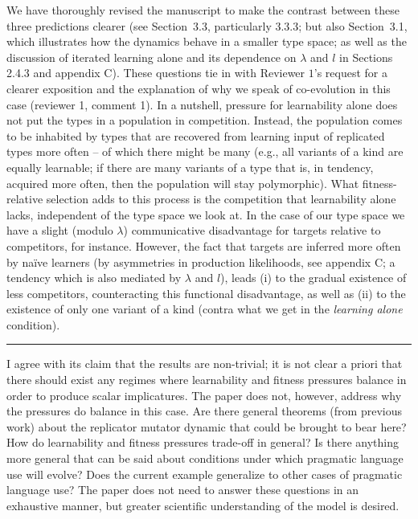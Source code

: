 \documentclass[12pt,a4paper]{article}
\begin{document}
We have thoroughly revised the manuscript to make the contrast between these three predictions clearer (see Section~3.3, particularly 3.3.3; but also Section~3.1, which illustrates how the dynamics behave in a smaller type space; as well as the discussion of iterated learning alone and its dependence on $\lambda$ and $l$ in Sections 2.4.3 and appendix C). These questions tie in with Reviewer $1$'s request for a clearer exposition and the explanation of why we speak of co-evolution in this case (reviewer 1, comment 1). In a nutshell, pressure for learnability alone does not put the types in a population in competition. Instead, the population comes to be inhabited by types that are recovered from learning input of replicated types more often -- of which there might be many (e.g., all variants of a kind are equally learnable; if there are many variants of a type that is, in tendency, acquired more often, then the population will stay polymorphic). What fitness-relative selection adds to this process is the competition that learnability alone lacks, independent of the type space we look at. In the case of our type space we have a slight (modulo $\lambda$) communicative disadvantage for targets relative to competitors, for instance. However, the fact that targets are inferred more often by na\"ive learners (by asymmetries in production likelihoods, see appendix C; a tendency which is also mediated by $\lambda$ and $l$), leads (i) to the gradual existence of less competitors, counteracting this functional disadvantage, as well as (ii) to the existence of only one variant of a kind (contra what we get in the {\em learning alone} condition).
%

\vspace{0.5cm}

\noindent\rule{\textwidth}{1pt}

\begin{mdframed}[backgroundcolor=gray!25,linecolor=gray!25,frametitle= Reviewer \thereviewerCounter~comment \thereviewerCommentCounter \hfill ~~({\it Model predictions})]
%
I agree with its claim that the results are non-trivial; it is not clear a priori that there should exist any regimes where learnability and fitness pressures balance in order to produce scalar implicatures. The paper does not, however, address why the pressures do balance in this case. Are there general theorems (from previous work) about the replicator mutator dynamic that could be brought to bear here? How do learnability and fitness pressures trade-off in general? Is there anything more general that can be said about conditions under which pragmatic language use will evolve? Does the current example generalize to other cases of pragmatic language use? The paper does not need to answer these questions in an exhaustive manner, but greater scientific understanding of the model is desired.
\end{mdframed}
\end{document}
